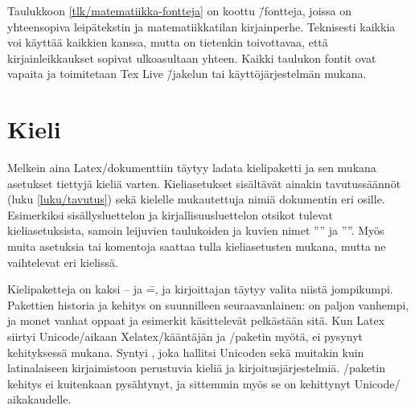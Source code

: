 
\noindent
Taulukkoon \ref{tlk/matematiikka-fontteja} on koottu  \=/fontteja, joissa on yhteensopiva leipätekstin ja
matematiikkatilan kirjainperhe. Teknisesti kaikkia voi käyttää kaikkien
kanssa, mutta on tietenkin toivottavaa, että kirjainleikkaukset sopivat
ulkoasultaan yhteen. Kaikki taulukon fontit ovat vapaita ja toimitetaan
Tex Live \=/jakelun tai käyttöjärjestelmän mukana.

\section{Kieli}
\label{luku/kieliasetukset}

Melkein aina Latex\-/dokumenttiin täytyy ladata kielipaketti ja sen
mukana asetukset tiettyjä kieliä varten. Kieliasetukset sisältävät
ainakin tavutussäännöt (luku \ref{luku/tavutus}) sekä kielelle
mukautettuja nimiä dokumentin eri osille. Esimerkiksi sisällysluettelon
ja kirjallisuusluettelon otsikot tulevat kieliasetuksista, samoin
leijuvien taulukoiden ja kuvien nimet ''\tablename'' ja ''\figurename''.
Myös muita asetuksia tai komentoja saattaa tulla kieliasetusten mukana,
mutta ne vaihtelevat eri kielissä.

Kielipaketteja on kaksi --  ja  \==,
ja kirjoittajan täytyy valita niistä jompikumpi. Pakettien historia ja
kehitys on suunnilleen seuraavanlainen:  on paljon
vanhempi, ja monet vanhat oppaat ja esimerkit käsittelevät pelkästään
sitä. Kun Latex siirtyi Unicode\-/aikaan Xelatex\-/kääntäjän ja
\-/paketin myötä,  ei pysynyt
kehityksessä mukana. Syntyi , joka hallitsi
Unicoden sekä muitakin kuin latinalaiseen kirjaimistoon perustuvia
kieliä ja kirjoitusjärjestelmiä. \-/paketin kehitys ei
kuitenkaan pysähtynyt, ja sittemmin myös se on kehittynyt Unicode\-/
aikakaudelle.

